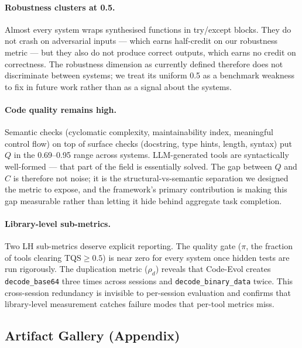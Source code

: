\documentclass[sigplan,nonacm,natbib=false]{acmart}
\begin{document}
\paragraph{Robustness clusters at 0.5.} Almost every system wraps synthesised functions in try/except blocks. They do not crash on adversarial inputs --- which earns half-credit on our robustness metric --- but they also do not produce correct outputs, which earns no credit on correctness. The robustness dimension as currently defined therefore does not discriminate between systems; we treat its uniform 0.5 as a benchmark weakness to fix in future work rather than as a signal about the systems.

\paragraph{Code quality remains high.} Semantic checks (cyclomatic complexity, maintainability index, meaningful control flow) on top of surface checks (docstring, type hints, length, syntax) put $Q$ in the 0.69--0.95 range across systems. LLM-generated tools are syntactically well-formed --- that part of the field is essentially solved. The gap between $Q$ and $C$ is therefore not noise; it is the structural-vs-semantic separation we designed the metric to expose, and the framework's primary contribution is making this gap measurable rather than letting it hide behind aggregate task completion.

\paragraph{Library-level sub-metrics.} Two LH sub-metrics deserve explicit reporting. The quality gate ($\pi$, the fraction of tools clearing TQS$\geq 0.5$) is near zero for every system once hidden tests are run rigorously. The duplication metric ($\rho_d$) reveals that Code-Evol creates \texttt{decode\_base64} three times across sessions and \texttt{decode\_binary\_data} twice. This cross-session redundancy is invisible to per-session evaluation and confirms that library-level measurement catches failure modes that per-tool metrics miss.

\subsection{Artifact Gallery (Appendix)}
\label{sec:artifact_gallery}
\end{document}
